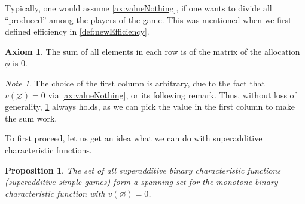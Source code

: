 \documentclass[12pt,letterpaper,final]{article}
\theoremstyle{plain}
\theoremstyle{plain}
\newtheorem{proposition}[theorem]{Proposition}
\theoremstyle{plain}
\theoremstyle{plain}
\theoremstyle{plain}
\theoremstyle{plain}
\theoremstyle{plain}
\theoremstyle{definition}
\theoremstyle{definition}
\theoremstyle{definition}
\theoremstyle{definition}
\theoremstyle{definition}
\newtheorem{axiom}{Axiom}[section]
\theoremstyle{remark}
\theoremstyle{remark}
\newtheorem*{note}{Note}
\theoremstyle{remark}
\theoremstyle{remark}
\begin{document}
Typically, one would assume \cref{ax:valueNothing}, if one wants to
divide all ``produced'' among the players of the game. This was
mentioned when we first defined efficiency in
\cref{def:newEfficiency}.

\begin{axiom}\label{ax:rowSum0}
  The sum of all elements in each row is of the matrix of the
  allocation \(\phi\) is 0.
\end{axiom}

\begin{note}
  The choice of the first column is arbitrary, due to the fact that
  \(v(\varnothing)=0\) via \cref{ax:valueNothing}, or its following
  remark. Thus, without loss of generality, \cref{ax:rowSum0} always
  holds, as we can pick the value in the first column to make the
  sum work.
\end{note}

To first proceed, let us get an idea what we can do with superadditive
characteristic functions.

\begin{proposition}\label{prop:superBinarySpan}
  The set of all superadditive binary characteristic functions
  (superadditive simple games) form a spanning set for
  the monotone binary characteristic function with
  \(v(\varnothing)=0\). 
\end{proposition}
\end{document}
